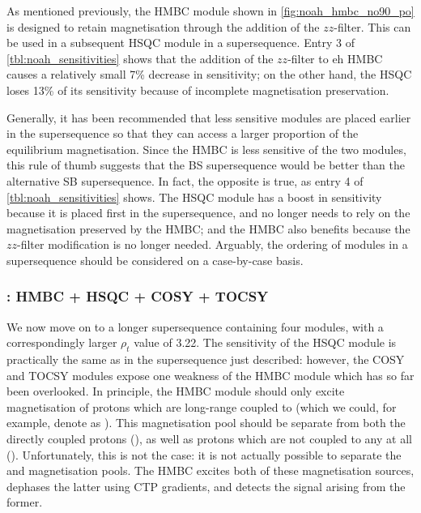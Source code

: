 As mentioned previously, the HMBC module shown in \cref{fig:noah_hmbc_no90_po} is designed to retain  magnetisation through the addition of the $zz$-filter.
This can be used in a subsequent HSQC module in a  supersequence.
Entry 3 of \cref{tbl:noah_sensitivities} shows that the addition of the $zz$-filter to eh HMBC causes a relatively small 7\% decrease in sensitivity; on the other hand, the HSQC loses 13\% of its sensitivity because of incomplete magnetisation preservation.

Generally, it has been recommended that less sensitive modules are placed earlier in the supersequence so that they can access a larger proportion of the equilibrium magnetisation.
Since the HMBC is less sensitive of the two modules, this rule of thumb suggests that the BS supersequence would be better than the alternative SB supersequence.
In fact, the opposite is true, as entry 4 of \cref{tbl:noah_sensitivities} shows.
The HSQC module has a boost in sensitivity because it is placed first in the supersequence, and no longer needs to rely on the  magnetisation preserved by the HMBC; and the HMBC also benefits because the $zz$-filter modification is no longer needed.
Arguably, the ordering of modules in a supersequence should be considered on a case-by-case basis.

\subsubsection{: HMBC + HSQC + COSY + TOCSY}

We now move on to a longer supersequence containing four modules, with a correspondingly larger $\rho_t$ value of 3.22.
The sensitivity of the HSQC module is practically the same as in the  supersequence just described: however, the COSY and TOCSY modules expose one weakness of the HMBC module which has so far been overlooked.
In principle, the HMBC module should only excite magnetisation of protons which are long-range coupled to \carbon{} (which we could, for example, denote as ).
This magnetisation pool should be separate from both the directly coupled protons (), as well as protons which are not coupled to any \carbon{} at all ().
Unfortunately, this is not the case: it is not actually possible to separate the  and  magnetisation pools.
The HMBC excites both of these magnetisation sources, dephases the latter using CTP gradients, and detects the signal arising from the former.

